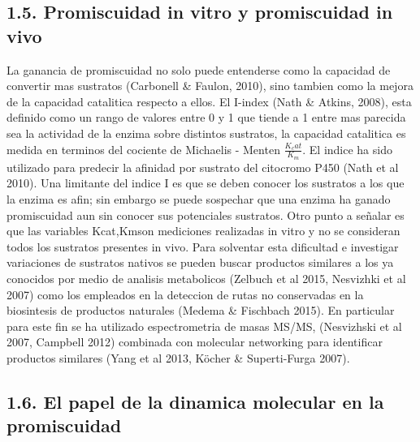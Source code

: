 \documentclass[12pt,twoside]{reedthesis}
\begin{document}
  \subsection{1.5. Promiscuidad in vitro y promiscuidad in
  vivo}\label{promiscuidad-in-vitro-y-promiscuidad-in-vivo}
  
  La ganancia de promiscuidad no solo puede entenderse como la capacidad
  de convertir mas sustratos (Carbonell \& Faulon, 2010), sino tambien
  como la mejora de la capacidad catalitica respecto a ellos. El I-index
  (Nath \& Atkins, 2008), esta definido como un rango de valores entre 0 y
  1 que tiende a 1 entre mas parecida sea la actividad de la enzima sobre
  distintos sustratos, la capacidad catalitica es medida en terminos del
  cociente de Michaelis - Menten \(\frac{K_cat}{K_m}\). El indice ha sido
  utilizado para predecir la afinidad por sustrato del citocromo P450
  (Nath et al 2010). Una limitante del indice I es que se deben conocer
  los sustratos a los que la enzima es afin; sin embargo se puede
  sospechar que una enzima ha ganado promiscuidad aun sin conocer sus
  potenciales sustratos. Otro punto a señalar es que las variables
  Kcat,Kmson mediciones realizadas in vitro y no se consideran todos los
  sustratos presentes in vivo. Para solventar esta dificultad e investigar
  variaciones de sustratos nativos se pueden buscar productos similares a
  los ya conocidos por medio de analisis metabolicos (Zelbuch et al 2015,
  Nesvizhki et al 2007) como los empleados en la deteccion de rutas no
  conservadas en la biosintesis de productos naturales (Medema \&
  Fischbach 2015). En particular para este fin se ha utilizado
  espectrometria de masas MS/MS, (Nesvizhski et al 2007, Campbell 2012)
  combinada con molecular networking para identificar productos similares
  (Yang et al 2013, Köcher \& Superti-Furga 2007).
  
  \subsection{1.6. El papel de la dinamica molecular en la
  promiscuidad}\label{el-papel-de-la-dinamica-molecular-en-la-promiscuidad}
  
\end{document}
